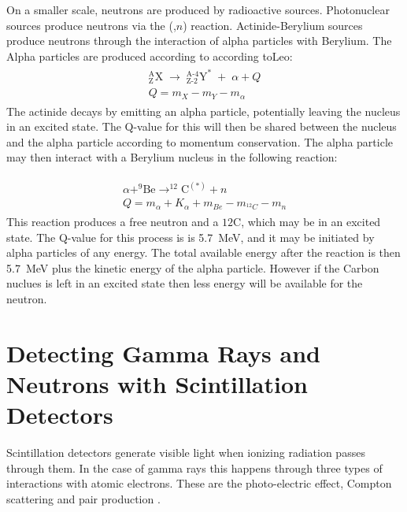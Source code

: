 \documentclass[main.tex]{subfiles}
\begin{document}
On a smaller scale, neutrons are produced by radioactive sources. Photonuclear sources produce neutrons via the (\textgamma ,$n$) reaction. Actinide-Berylium sources produce neutrons through the interaction of alpha particles with Berylium. The Alpha particles are produced according to according to{Leo}:
\begin{equation}
	\begin{split}
	\begin{gathered}
		^\textrm{A}_\textrm{Z}\textrm{X}\;\rightarrow\;^{\textrm{A-4}}_{\textrm{Z-2}}\textrm{Y}^*\;+\;\alpha +Q\\
		Q = m_X-m_Y - m_\alpha
	\label{eq:actinide}
	\end{gathered}
	\end{split}
\end{equation}
The actinide decays by emitting an alpha particle, potentially leaving the nucleus in an excited state. The Q-value for this will then be shared between the nucleus and the alpha particle according to momentum conservation. The alpha particle may then interact with a Berylium nucleus in the following reaction:

\begin{equation}
	\begin{split}
	  \begin{gathered}
		\alpha+^\text{9}\text{Be}\rightarrow^\text{12}\text{C}^{(*)}+n\\
		Q=m_\alpha + K_\alpha + m_{Be} -m_{^{12}C} - m_n
	\end{gathered}
	\end{split}
	\label{eq:alphaBe}
\end{equation}
This reaction produces a free neutron and a $\textrm{12}$C, which may be in an excited state. The Q-value for this process is is \SI{5.7}{MeV}, and it may be initiated by alpha particles of any energy. The total available energy after the reaction is then \SI{5.7}{MeV} plus the kinetic energy of the alpha particle. However if the Carbon nuclues is left in an excited state then less energy will be available for the neutron.

\section{Detecting Gamma Rays and Neutrons with Scintillation Detectors}
Scintillation detectors generate visible light when ionizing radiation passes through them. In the case of gamma rays this happens through three types of interactions with atomic electrons. These are the photo-electric effect, Compton scattering and pair production \cite{Krane}.
\end{document}
